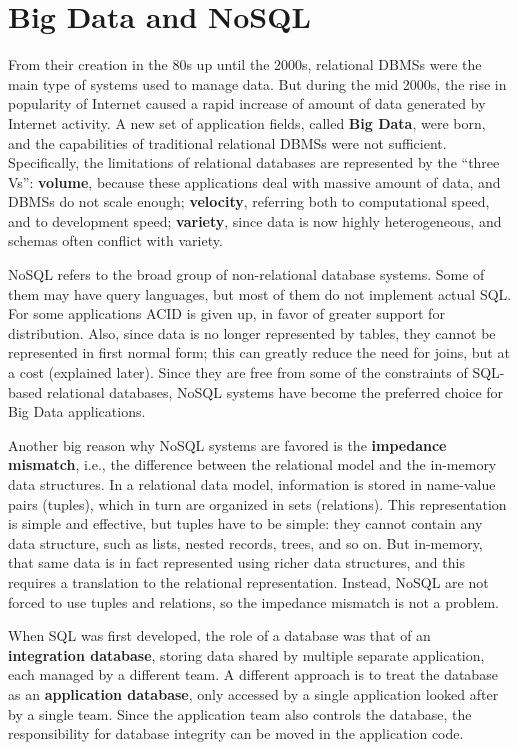 \chapter{Big Data and NoSQL}

From their creation in the 80s up until the 2000s, relational DBMSs were the main type of systems used to manage data. But during the mid 2000s, the rise in popularity of Internet caused a rapid increase of amount of data generated by Internet activity. A new set of application fields, called \textbf{Big Data}, were born, and the capabilities of traditional relational DBMSs were not sufficient. Specifically, the limitations of relational databases are represented by the ``three Vs'': \textbf{volume}, because these applications deal with massive amount of data, and DBMSs do not scale enough; \textbf{velocity}, referring both to computational speed, and to development speed; \textbf{variety}, since data is now highly heterogeneous, and schemas often conflict with variety.

NoSQL refers to the broad group of non-relational database systems. Some of them may have query languages, but most of them do not implement actual SQL. For some applications ACID is given up, in favor of greater support for distribution. Also, since data is no longer represented by tables, they cannot be represented in first normal form; this can greatly reduce the need for joins, but at a cost (explained later). Since they are free from some of the constraints of SQL-based relational databases, NoSQL systems have become the preferred choice for Big Data applications.

Another big reason why NoSQL systems are favored is the \textbf{impedance mismatch}, i.e., the difference between the relational model and the in-memory data structures. In a relational data model, information is stored in name-value pairs (tuples), which in turn are organized in sets (relations). This representation is simple and effective, but tuples have to be simple: they cannot contain any data structure, such as lists, nested records, trees, and so on. But in-memory, that same data is in fact represented using richer data structures, and this requires a translation to the relational representation. Instead, NoSQL are not forced to use tuples and relations, so the impedance mismatch is not a problem.

When SQL was first developed, the role of a database was that of an \textbf{integration database}, storing data shared by multiple separate application, each managed by a different team. A different approach is to treat the database as an \textbf{application database}, only accessed by a single application looked after by a single team. Since the application team also controls the database, the responsibility for database integrity can be moved in the application code.

